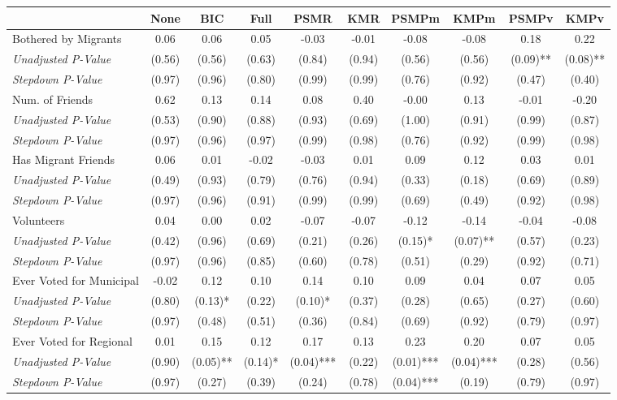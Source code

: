 \begin{tabular}{l c c c c c c c c c}
\toprule
 & None & BIC & Full & PSMR & KMR & PSMPm & KMPm & PSMPv & KMPv \\
\midrule
Bothered by Migrants & 0.06 & 0.06 & 0.05 & -0.03 & -0.01 & -0.08 & -0.08 & 0.18 & 0.22 \\
\quad \textit{Unadjusted P-Value} & (0.56) & (0.56) & (0.63) & (0.84) & (0.94) & (0.56) & (0.56) & (0.09)** & (0.08)** \\
\quad \textit{Stepdown P-Value} & (0.97) & (0.96) & (0.80) & (0.99) & (0.99) & (0.76) & (0.92) & (0.47) & (0.40) \\
Num. of Friends & 0.62 & 0.13 & 0.14 & 0.08 & 0.40 & -0.00 & 0.13 & -0.01 & -0.20 \\
\quad \textit{Unadjusted P-Value} & (0.53) & (0.90) & (0.88) & (0.93) & (0.69) & (1.00) & (0.91) & (0.99) & (0.87) \\
\quad \textit{Stepdown P-Value} & (0.97) & (0.96) & (0.97) & (0.99) & (0.98) & (0.76) & (0.92) & (0.99) & (0.98) \\
Has Migrant Friends & 0.06 & 0.01 & -0.02 & -0.03 & 0.01 & 0.09 & 0.12 & 0.03 & 0.01 \\
\quad \textit{Unadjusted P-Value} & (0.49) & (0.93) & (0.79) & (0.76) & (0.94) & (0.33) & (0.18) & (0.69) & (0.89) \\
\quad \textit{Stepdown P-Value} & (0.97) & (0.96) & (0.91) & (0.99) & (0.99) & (0.69) & (0.49) & (0.92) & (0.98) \\
Volunteers & 0.04 & 0.00 & 0.02 & -0.07 & -0.07 & -0.12 & -0.14 & -0.04 & -0.08 \\
\quad \textit{Unadjusted P-Value} & (0.42) & (0.96) & (0.69) & (0.21) & (0.26) & (0.15)* & (0.07)** & (0.57) & (0.23) \\
\quad \textit{Stepdown P-Value} & (0.97) & (0.96) & (0.85) & (0.60) & (0.78) & (0.51) & (0.29) & (0.92) & (0.71) \\
Ever Voted for Municipal & -0.02 & 0.12 & 0.10 & 0.14 & 0.10 & 0.09 & 0.04 & 0.07 & 0.05 \\
\quad \textit{Unadjusted P-Value} & (0.80) & (0.13)* & (0.22) & (0.10)* & (0.37) & (0.28) & (0.65) & (0.27) & (0.60) \\
\quad \textit{Stepdown P-Value} & (0.97) & (0.48) & (0.51) & (0.36) & (0.84) & (0.69) & (0.92) & (0.79) & (0.97) \\
Ever Voted for Regional & 0.01 & 0.15 & 0.12 & 0.17 & 0.13 & 0.23 & 0.20 & 0.07 & 0.05 \\
\quad \textit{Unadjusted P-Value} & (0.90) & (0.05)** & (0.14)* & (0.04)*** & (0.22) & (0.01)*** & (0.04)*** & (0.28) & (0.56) \\
\quad \textit{Stepdown P-Value} & (0.97) & (0.27) & (0.39) & (0.24) & (0.78) & (0.04)*** & (0.19) & (0.79) & (0.97) \\
\bottomrule
\end{tabular}
